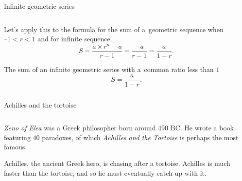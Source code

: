 \documentclass[9pt,aspectratio=169]{beamer}
\begin{document}
\begin{frame}{Infinite geometric series}
\begin{columns}[T]
\begin{column}{0.5\textwidth}
      Let’s apply this to the formula for the sum of a~geometric sequence when $–1 < r < 1$ and for infinite sequence.
      \[ S = \frac{a \times r^n - a}{r - 1} = \frac{-a}{r - 1} = \frac{a}{1 - r}. \]
      \begin{definition}
        The sum of an infinite geometric series with a~common ratio less than $1$ 
        \[ S = \frac{a}{1 - r}. \]
        \vspace*{-0.5em}
      \end{definition}
    \end{column}
  \end{columns}
\end{frame}

\begin{frame}{Achilles and the tortoise}
  \begin{columns}[T]
    \begin{column}{0.5\textwidth}
      \emph{Zeno of Elea} was a Greek philosopher born around 490 BC.  He wrote a book featuring 40 paradoxes, of which \emph{Achilles and the Tortoise} is perhaps the most famous.
      
      Achilles, the ancient Greek hero, is chasing after a tortoise. Achilles is much faster than the tortoise, and so he must eventually catch up with it. 
      

\end{column}
\end{columns}
\end{frame}
\end{document}
